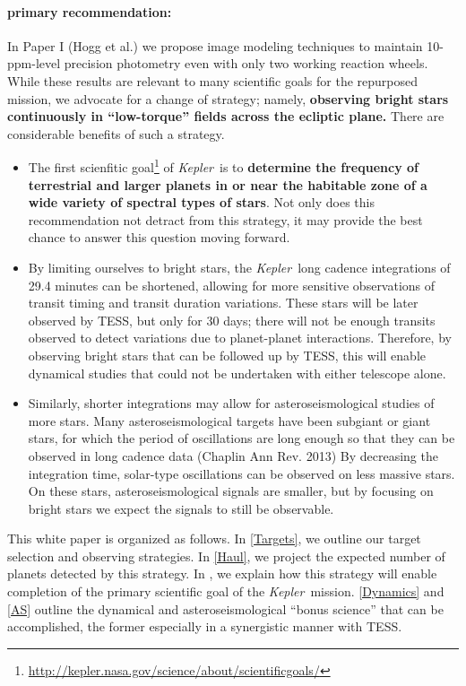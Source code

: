 \documentclass[12pt, preprint]{aastex}
\newcommand{\observatory}[1]{\textsl{#1}}
\newcommand{\kepler}{\observatory{Kepler}}
\newcommand{\Kepler}{\kepler}
\begin{document}
\paragraph{primary recommendation:}
In Paper I (Hogg et al.) we propose image modeling techniques to 
  maintain 10-ppm-level precision photometry even with only two working 
  reaction wheels. 
While these results are relevant to many scientific goals
  for the repurposed mission, we advocate for a change of strategy; namely, 
  \textbf{observing bright stars continuously in ``low-torque'' fields across the ecliptic plane.}
There are considerable benefits of such a strategy. 
\begin{itemize}
\item
The first scienfitic goal\footnote{\url{http://kepler.nasa.gov/science/about/scientificgoals/}} of \Kepler\ is to \textbf{determine the frequency 
 of terrestrial and larger planets in or near the habitable zone of a wide 
 variety of spectral types of stars}. 
Not only does this recommendation not detract from this strategy, it may 
 provide the best chance to answer this question moving forward.
\item
By limiting ourselves to bright stars, the \kepler\ long cadence integrations of 29.4 minutes can be shortened, allowing for more sensitive observations of transit timing and transit duration variations.
These stars will be later observed by TESS, but only for 30 days; there will not be enough transits observed to detect variations due to planet-planet interactions.
Therefore, by observing bright stars that can be followed up by TESS, this will enable dynamical studies that could not be undertaken with either telescope alone.
\item
Similarly, shorter integrations may allow for asteroseismological studies of 
 more stars. 
Many asteroseismological targets have been subgiant or giant stars, for which 
 the period of oscillations are long enough so that they can be observed in 
 long cadence data (Chaplin Ann Rev. 2013)
By decreasing the integration time, solar-type oscillations can be observed 
 on less massive stars.
On these stars, asteroseismological signals are smaller, but by focusing on 
 bright stars we expect the signals to still be observable.
\end{itemize}
This white paper is organized as follows. In \textsection\ref{Targets}, we outline our target selection and observing strategies. In \textsection\ref{Haul}, we project the expected number of planets detected by this strategy. In , we explain how this strategy will enable completion of the primary scientific goal of the \Kepler\ mission. \textsection\ref{Dynamics} and \textsection\ref{AS} outline the dynamical and asteroseismological ``bonus science'' that can be accomplished, the former especially in a synergistic manner with TESS. 
\end{document}
